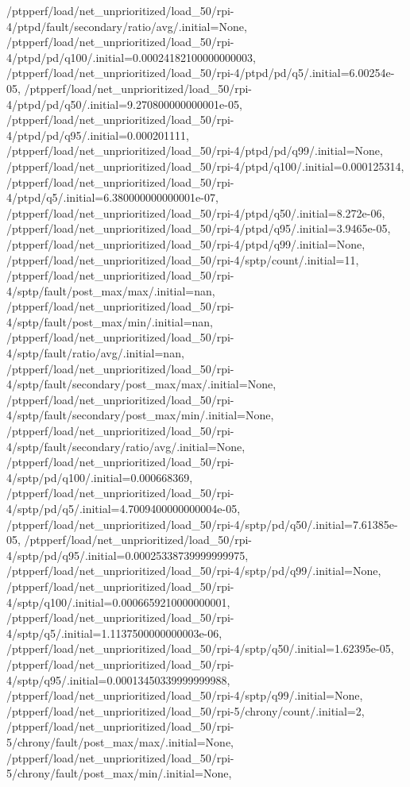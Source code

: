 {    /ptpperf/load/net_unprioritized/load_50/rpi-4/ptpd/fault/secondary/ratio/avg/.initial=None,
    /ptpperf/load/net_unprioritized/load_50/rpi-4/ptpd/pd/q100/.initial=0.00024182100000000003,
    /ptpperf/load/net_unprioritized/load_50/rpi-4/ptpd/pd/q5/.initial=6.00254e-05,
    /ptpperf/load/net_unprioritized/load_50/rpi-4/ptpd/pd/q50/.initial=9.270800000000001e-05,
    /ptpperf/load/net_unprioritized/load_50/rpi-4/ptpd/pd/q95/.initial=0.000201111,
    /ptpperf/load/net_unprioritized/load_50/rpi-4/ptpd/pd/q99/.initial=None,
    /ptpperf/load/net_unprioritized/load_50/rpi-4/ptpd/q100/.initial=0.000125314,
    /ptpperf/load/net_unprioritized/load_50/rpi-4/ptpd/q5/.initial=6.380000000000001e-07,
    /ptpperf/load/net_unprioritized/load_50/rpi-4/ptpd/q50/.initial=8.272e-06,
    /ptpperf/load/net_unprioritized/load_50/rpi-4/ptpd/q95/.initial=3.9465e-05,
    /ptpperf/load/net_unprioritized/load_50/rpi-4/ptpd/q99/.initial=None,
    /ptpperf/load/net_unprioritized/load_50/rpi-4/sptp/count/.initial=11,
    /ptpperf/load/net_unprioritized/load_50/rpi-4/sptp/fault/post_max/max/.initial=nan,
    /ptpperf/load/net_unprioritized/load_50/rpi-4/sptp/fault/post_max/min/.initial=nan,
    /ptpperf/load/net_unprioritized/load_50/rpi-4/sptp/fault/ratio/avg/.initial=nan,
    /ptpperf/load/net_unprioritized/load_50/rpi-4/sptp/fault/secondary/post_max/max/.initial=None,
    /ptpperf/load/net_unprioritized/load_50/rpi-4/sptp/fault/secondary/post_max/min/.initial=None,
    /ptpperf/load/net_unprioritized/load_50/rpi-4/sptp/fault/secondary/ratio/avg/.initial=None,
    /ptpperf/load/net_unprioritized/load_50/rpi-4/sptp/pd/q100/.initial=0.000668369,
    /ptpperf/load/net_unprioritized/load_50/rpi-4/sptp/pd/q5/.initial=4.7009400000000004e-05,
    /ptpperf/load/net_unprioritized/load_50/rpi-4/sptp/pd/q50/.initial=7.61385e-05,
    /ptpperf/load/net_unprioritized/load_50/rpi-4/sptp/pd/q95/.initial=0.00025338739999999975,
    /ptpperf/load/net_unprioritized/load_50/rpi-4/sptp/pd/q99/.initial=None,
    /ptpperf/load/net_unprioritized/load_50/rpi-4/sptp/q100/.initial=0.0006659210000000001,
    /ptpperf/load/net_unprioritized/load_50/rpi-4/sptp/q5/.initial=1.1137500000000003e-06,
    /ptpperf/load/net_unprioritized/load_50/rpi-4/sptp/q50/.initial=1.62395e-05,
    /ptpperf/load/net_unprioritized/load_50/rpi-4/sptp/q95/.initial=0.00013450339999999988,
    /ptpperf/load/net_unprioritized/load_50/rpi-4/sptp/q99/.initial=None,
    /ptpperf/load/net_unprioritized/load_50/rpi-5/chrony/count/.initial=2,
    /ptpperf/load/net_unprioritized/load_50/rpi-5/chrony/fault/post_max/max/.initial=None,
    /ptpperf/load/net_unprioritized/load_50/rpi-5/chrony/fault/post_max/min/.initial=None,
}

